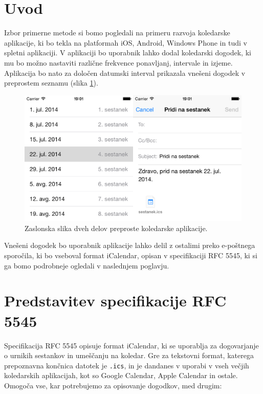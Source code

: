 \section{Uvod}

Izbor primerne metode si bomo pogledali na primeru razvoja koledarske aplikacije, ki bo tekla na platformah iOS, Android, Windows Phone in tudi v spletni aplikaciji. V aplikaciji bo uporabnik lahko dodal koledarski dogodek, ki mu bo možno nastaviti različne frekvence ponavljanj, intervale in izjeme. Aplikacija bo nato za določen datumski interval prikazala vnešeni dogodek v preprostem seznamu (slika \ref{fig:app-ios}).

\begin{figure}
 \includegraphics[width=\linewidth]{app-ios}
 \caption{Zaslonska slika dveh delov preproste koledarske aplikacije.}
 \label{fig:app-ios}
\end{figure}

Vnešeni dogodek bo uporabnik aplikacije lahko delil z ostalimi preko e-poštnega sporočila, ki bo vseboval format iCalendar, opisan v specifikaciji RFC 5545\cite{rfc5545}, ki si ga bomo podrobneje ogledali v naslednjem poglavju.

\section{Predstavitev specifikacije RFC 5545}

Specifikacija RFC 5545\cite{rfc5545} opisuje format iCalendar, ki se uporablja za dogovarjanje o urnikih sestankov in umeščanju na koledar. Gre za tekstovni format, katerega prepoznavna končnica datotek je \texttt{.ics}, in je dandanes v uporabi v vseh večjih koledarskih aplikacijah, kot so Google Calendar, Apple Calendar in ostale. Omogoča vse, kar potrebujemo za opisovanje dogodkov, med drugim:

